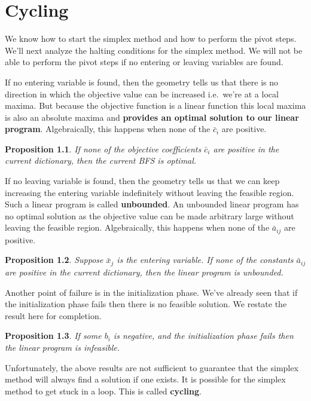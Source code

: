\documentclass[
]{book}
\newtheorem{proposition}{Proposition}[chapter]
\theoremstyle{definition}
\theoremstyle{definition}
\theoremstyle{definition}
\theoremstyle{definition}
\theoremstyle{remark}
\begin{document}
\hypertarget{cycling}{%
\chapter{Cycling}\label{cycling}}

We know how to start the simplex method and how to perform the pivot steps.
We'll next analyze the halting conditions for the simplex method.
We will not be able to perform the pivot steps if no entering or leaving variables are found.

If no entering variable is found, then the geometry tells us that there is no direction in which the objective value can be increased i.e.~we're at a local maxima.
But because the objective function is a linear function this local maxima is also an absolute maxima and \textbf{provides an optimal solution to our linear program}. Algebraically, this happens when none of the \(\bar{c}_i\) are positive.

\begin{proposition}
If none of the objective coefficients \(\bar{c}_i\) are positive in the current dictionary, then the current BFS is optimal.
\end{proposition}

If no leaving variable is found, then the geometry tells us that we can keep increasing the entering variable indefinitely without leaving the feasible region. Such a linear program is called \textbf{unbounded}.
An unbounded linear program has no optimal solution as the objective value can be made arbitrary large without leaving the feasible region. Algebraically, this happens when none of the \(\bar{a}_{ij}\) are positive.

\begin{proposition}
Suppose \(\bar{x}_j\) is the entering variable. If none of the constants \(\bar{a}_{ij}\) are positive in the current dictionary, then the linear program is unbounded.
\end{proposition}

Another point of failure is in the initialization phase. We've already seen that if the initialization phase fails then there is no feasible solution. We restate the result here for completion.

\begin{proposition}
If some \(b_i\) is negative, and the initialization phase fails then the linear program is infeasible.
\end{proposition}

Unfortunately, the above results are not sufficient to guarantee that the simplex method will always find a solution if one exists. It is possible for the simplex method to get stuck in a loop. This is called \textbf{cycling}.
\end{document}
